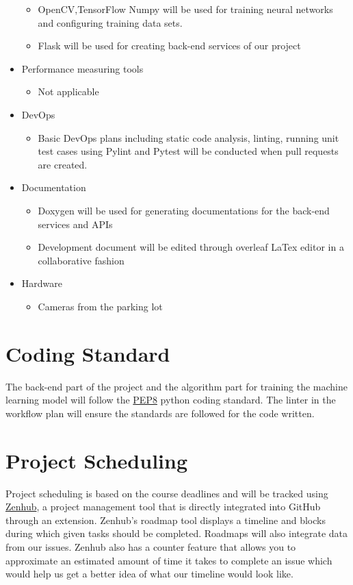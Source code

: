 \documentclass[12pt,letterpaper]{article}
\begin{document}
\begin{itemize}
\begin{itemize}
        \item OpenCV,TensorFlow Numpy will be used for training neural networks
        and configuring training data sets.
        \item Flask will be used for creating back-end services of our project
    \end{itemize}
    \item Performance measuring tools
    \begin{itemize}
        \item Not applicable
    \end{itemize}
    \item DevOps
    \begin{itemize}
        \item Basic DevOps plans including static code analysis, linting,
        running unit test cases using Pylint and Pytest will be conducted when
        pull requests are created.
    \end{itemize}
    \item Documentation
    \begin{itemize}
        \item Doxygen will be used for generating documentations for the
        back-end services and APIs
        \item Development document will be edited through overleaf LaTex editor
        in a collaborative fashion
    \end{itemize}
    \item Hardware
    \begin{itemize}
        \item Cameras from the parking lot 
    \end{itemize}
\end{itemize}

\section{Coding Standard}
The back-end part of the project and the algorithm part for training the machine
learning model will follow the \href{https://peps.python.org/pep-0008/} {PEP8}
python coding standard. The linter in the workflow plan will ensure the
standards are followed for the code written.

\section{Project Scheduling}
Project scheduling is based on the course deadlines and will be tracked using
\href{https://www.zenhub.com/}{Zenhub}, a project management tool that is
directly integrated into GitHub through an extension. Zenhub's roadmap tool
displays a timeline and blocks during which given tasks should be completed.
Roadmaps will also integrate data from our issues. Zenhub also has a counter
feature that allows you to approximate an estimated amount of time it takes to
complete an issue which would help us get a better idea of what our timeline
would look like.
\end{document}
